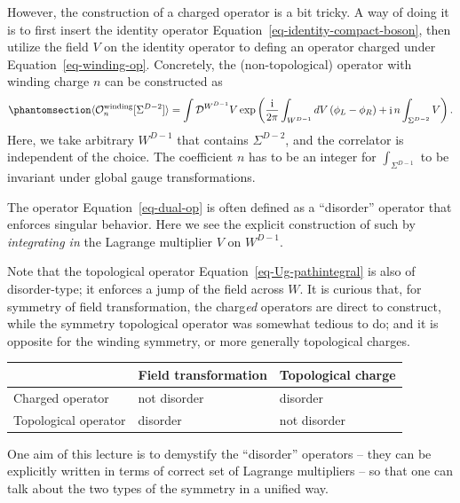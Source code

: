 \documentclass[11pt,toc=bibliography]{scrbook}
\DeclareMathOperator{\imunit}{i}
\newcommand{\stdim}{D}
\numberwithin{equation}{section}
\DeclareMathOperator{\imunit}{i}
\newcommand{\stdim}{D}
\begin{document}
However, the construction of a charged operator is a bit tricky. A way
of doing it is to first insert the identity operator
Equation~\ref{eq-identity-compact-boson}, then utilize the field \(V\)
on the identity operator to defing an operator charged under
Equation~\ref{eq-winding-op}. Concretely, the (non-topological) operator
with winding charge \(n\) can be constructed as
\begin{equation}\phantomsection\label{eq-dual-op}{
\langle \mathcal{O}^\text{winding}_n[\Sigma^{D-2}] \rangle
= \int \mathcal{D}^{W^{\stdim-1}}V \exp\left(\frac{\imunit}{2\pi}\int_{W^{\stdim-1}} \mathop{dV}\left(\phi_L-\phi_R\right)+\imunit n \int_{\Sigma^{\stdim-2}}V\right).
}\end{equation} Here, we take arbitrary \(W^{\stdim-1}\) that contains
\(\Sigma^{\stdim-2}\), and the correlator is independent of the choice.
The coefficient \(n\) has to be an integer for \(\int_{\Sigma^{D-1}}\)
to be invariant under global gauge transformations.

The operator Equation~\ref{eq-dual-op} is often defined as a
``disorder'' operator that enforces singular behavior. Here we see the
explicit construction of such by \emph{integrating in} the Lagrange
multiplier \(V\) on \(W^{\stdim-1}\).

\begin{tcolorbox}[enhanced jigsaw, opacityback=0, opacitybacktitle=0.6, leftrule=.75mm, arc=.35mm, coltitle=black, breakable, colframe=quarto-callout-note-color-frame, titlerule=0mm, colback=white, bottomrule=.15mm, left=2mm, colbacktitle=quarto-callout-note-color!10!white, toptitle=1mm, bottomtitle=1mm, title=\textcolor{quarto-callout-note-color}{\faInfo}\hspace{0.5em}{Note}, rightrule=.15mm, toprule=.15mm]

Note that the topological operator Equation~\ref{eq-Ug-pathintegral} is
also of disorder-type; it enforces a jump of the field across \(W\). It
is curious that, for symmetry of field transformation, the
charg\emph{ed} operators are direct to construct, while the symmetry
topological operator was somewhat tedious to do; and it is opposite for
the winding symmetry, or more generally topological charges.

\begin{longtable}[]{@{}lll@{}}
\toprule\noalign{}
& Field transformation & Topological charge \\
\midrule\noalign{}
\endhead
\bottomrule\noalign{}
\endlastfoot
Charged operator & not disorder & disorder \\
Topological operator & disorder & not disorder \\
\end{longtable}

One aim of this lecture is to demystify the ``disorder'' operators --
they can be explicitly written in terms of correct set of Lagrange
multipliers -- so that one can talk about the two types of the symmetry
in a unified way.

\end{tcolorbox}
\end{document}
